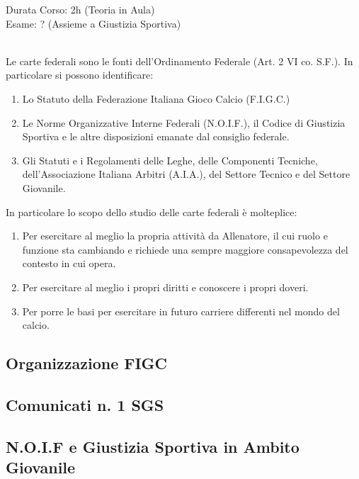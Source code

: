\documentclass[../uefaC.tex]{subfiles}
\begin{document}

Durata Corso: 2h (Teoria in Aula) \hfill \\
Esame: ? (Assieme a Giustizia Sportiva)

\hfill \\
Le carte federali sono le fonti dell'Ordinamento Federale (Art. 2 VI co. S.F.). In particolare si possono identificare:
\begin{enumerate}
    \item Lo Statuto della Federazione Italiana Gioco Calcio (F.I.G.C.)
    \item Le Norme Organizzative Interne Federali (N.O.I.F.), il Codice di Giustizia Sportiva e le altre disposizioni emanate dal consiglio federale.
    \item Gli Statuti e i Regolamenti delle Leghe, delle Componenti Tecniche, dell'Associazione Italiana Arbitri (A.I.A.), del Settore Tecnico e del Settore Giovanile.
\end{enumerate}

In particolare lo scopo dello studio delle carte federali è molteplice:
\begin{enumerate}
    \item Per esercitare al meglio la propria attività da Allenatore, il cui ruolo e funzione sta cambiando e richiede una sempre maggiore consapevolezza del contesto in cui opera.
    \item Per esercitare al meglio i propri diritti e conoscere i propri doveri.
    \item Per porre le basi per esercitare in futuro carriere differenti nel mondo del calcio.
\end{enumerate}

\subsection{Organizzazione FIGC}



\subsection{Comunicati n. 1 SGS}

\subsection{N.O.I.F e Giustizia Sportiva in Ambito Giovanile}
\end{document}
